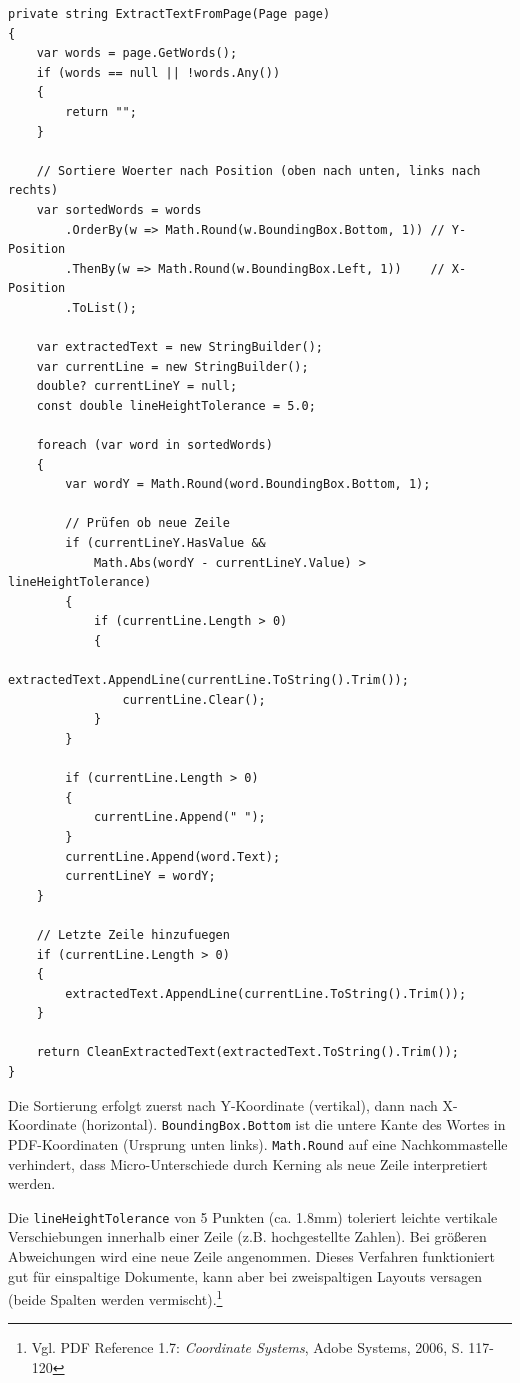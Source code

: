 \begin{lstlisting}[language={[Sharp]C}, caption={Geometrische Wort-Sortierung}, label={lst:word_extraction}]
private string ExtractTextFromPage(Page page)
{
    var words = page.GetWords();
    if (words == null || !words.Any())
    {
        return "";
    }

    // Sortiere Woerter nach Position (oben nach unten, links nach rechts)
    var sortedWords = words
        .OrderBy(w => Math.Round(w.BoundingBox.Bottom, 1)) // Y-Position
        .ThenBy(w => Math.Round(w.BoundingBox.Left, 1))    // X-Position
        .ToList();

    var extractedText = new StringBuilder();
    var currentLine = new StringBuilder();
    double? currentLineY = null;
    const double lineHeightTolerance = 5.0;

    foreach (var word in sortedWords)
    {
        var wordY = Math.Round(word.BoundingBox.Bottom, 1);
        
        // Prüfen ob neue Zeile
        if (currentLineY.HasValue && 
            Math.Abs(wordY - currentLineY.Value) > lineHeightTolerance)
        {
            if (currentLine.Length > 0)
            {
                extractedText.AppendLine(currentLine.ToString().Trim());
                currentLine.Clear();
            }
        }
        
        if (currentLine.Length > 0)
        {
            currentLine.Append(" ");
        }
        currentLine.Append(word.Text);
        currentLineY = wordY;
    }

    // Letzte Zeile hinzufuegen
    if (currentLine.Length > 0)
    {
        extractedText.AppendLine(currentLine.ToString().Trim());
    }

    return CleanExtractedText(extractedText.ToString().Trim());
}
\end{lstlisting}

Die Sortierung erfolgt zuerst nach Y-Koordinate (vertikal), dann nach X-Koordinate (horizontal). \texttt{BoundingBox.Bottom} ist die untere Kante des Wortes in PDF-Koordinaten (Ursprung unten links). \texttt{Math.Round} auf eine Nachkommastelle verhindert, dass Micro-Unterschiede durch Kerning als neue Zeile interpretiert werden.

Die \texttt{lineHeightTolerance} von 5 Punkten (ca. 1.8mm) toleriert leichte vertikale Verschiebungen innerhalb einer Zeile (z.B. hochgestellte Zahlen). Bei größeren Abweichungen wird eine neue Zeile angenommen. Dieses Verfahren funktioniert gut für einspaltige Dokumente, kann aber bei zweispaltigen Layouts versagen (beide Spalten werden vermischt).\footnote{Vgl. PDF Reference 1.7: \textit{Coordinate Systems}, Adobe Systems, 2006, S. 117-120}


